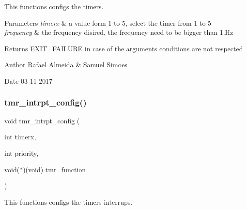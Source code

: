 This functions configs the timer\textquotesingle{}s. 


\begin{DoxyParams}{Parameters}
{\em timerx} & a value form 1 to 5, select the timer from 1 to 5 \\
\hline
{\em frequency} & the frequency disired, the frequency need to be bigger than 1.\+Hz\\
\hline
\end{DoxyParams}
\begin{DoxyReturn}{Returns}
E\+X\+I\+T\+\_\+\+F\+A\+I\+L\+U\+RE in case of the argument\textquotesingle{}s conditions are not respected 
\end{DoxyReturn}
\begin{DoxyAuthor}{Author}
Rafael Almeida \& Samuel Simoes 
\end{DoxyAuthor}
\begin{DoxyDate}{Date}
03-\/11-\/2017 
\end{DoxyDate}
\mbox{\label{timer__libs_8h_acf42c44ac046a888c4a5c615adfd32c8}} 
\subsubsection{tmr\+\_\+intrpt\+\_\+config()}
{\footnotesize\ttfamily void tmr\+\_\+intrpt\+\_\+config (\begin{DoxyParamCaption}\item[{int}]{timerx,  }\item[{int}]{priority,  }\item[{void($\ast$)(void)}]{tmr\+\_\+function }\end{DoxyParamCaption})}



This functions configs the timer\textquotesingle{}s interrups. 


